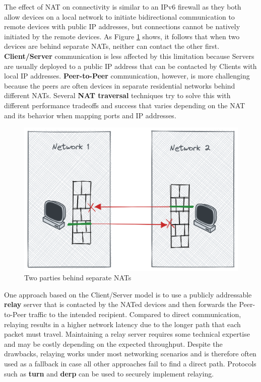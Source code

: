 The effect of NAT on connectivity is similar to an IPv6 firewall as they
both allow devices on a local network to initiate bidirectional
communication to remote devices with public IP addresses, but
connections cannot be natively initiated by the remote devices. As
Figure \ref{nat-intro} shows, it follows that when two devices are
behind separate NATs, neither can contact the other first.
\textbf{Client/Server} communication is less affected by this limitation
because Servers are usually deployed to a public IP address that can be
contacted by Clients with local IP addresses. \textbf{Peer-to-Peer}
communication, however, is more challenging because the peers are often
devices in separate residential networks behind different NATs. Several
\textbf{NAT traversal} techniques try to solve this with different
performance tradeoffs and success that varies depending on the NAT
\autocite{natBehaviorRFC} and its behavior when mapping ports and IP
addresses.

\begin{figure}
\centering
\includegraphics[width=\textwidth,height=0.25\textheight]{thesis/../figures/nat-intro.png}
\caption{Two parties behind separate NATs\label{nat-intro}}
\end{figure}

One approach based on the Client/Server model is to use a publicly
addressable \textbf{relay} server that is contacted by the NATed devices
and then forwards the Peer-to-Peer traffic to the intended recipient.
Compared to direct communication, relaying results in a higher network
latency due to the longer path that each packet must travel. Maintaining
a relay server requires some technical expertise and may be costly
depending on the expected throughput. Despite the drawbacks, relaying
works under most networking scenarios and is therefore often used as a
fallback in case all other approaches fail to find a direct path.
Protocols such as \textbf{\acrfull{turn}} \autocite{turnRFC} and
\textbf{\acrfull{derp}} \autocite{derpDocs} can be used to securely
implement relaying.

